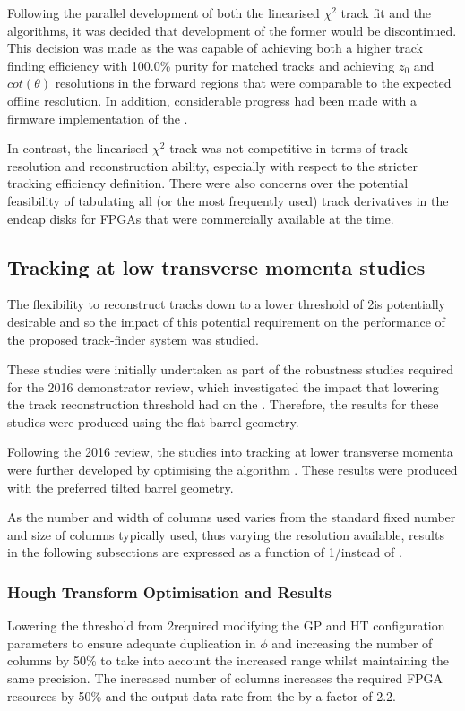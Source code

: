 Following the parallel development of both the linearised $\chi^{2}$ track fit and the \KF algorithms, it was decided that development of the former would be discontinued.
This decision was made as the \KF was capable of achieving both a higher track finding efficiency with 100.0\% purity for matched tracks and achieving $z_{0}$ and $cot(\theta)$ resolutions in the forward regions that were comparable to the expected offline resolution.
In addition, considerable progress had been made with a firmware implementation of the \KF.

In contrast, the linearised $\chi^{2}$ track was not competitive in terms of track resolution and reconstruction ability, especially with respect to the stricter tracking efficiency definition.
There were also concerns over the potential feasibility of tabulating all (or the most frequently used) track derivatives in the endcap disks for FPGAs that were commercially available at the time.

\subsection{Tracking at low transverse momenta studies}\label{subsec:Tmtt2GeV}
The flexibility to reconstruct tracks down to a lower \pT threshold of 2\GeV is potentially desirable and so the impact of this potential requirement on the performance of the proposed track-finder system was studied.

These studies were initially undertaken as part of the robustness studies required for the 2016 demonstrator review, which investigated the impact that lowering the track reconstruction \pT threshold had on the \HT.
Therefore, the results for these studies were produced using the flat barrel geometry.

Following the 2016 review, the studies into tracking at lower transverse momenta were further developed by optimising the \KF algorithm .
These results were produced with the preferred tilted barrel geometry.

As the number and width of \qpt \HT columns used varies from the standard fixed number and size of columns typically used, thus varying the \pT resolution available, results in the following subsections are expressed as a function of 1/\pT instead of \pT.

\subsubsection{Hough Transform Optimisation and Results}\label{subsubsec:lowPtOptHT}
Lowering the \pT threshold from 2\GeVc required modifying the GP and HT configuration parameters to ensure adequate duplication in $\phi$ and increasing the number of \qpt columns by 50\% to take into account the increased \pt range whilst maintaining the same precision.
The increased number of \qpt columns increases the required FPGA resources by 50\% and the output data rate from the \HT by a factor of 2.2.

